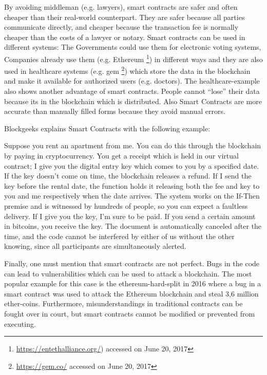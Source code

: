 By avoiding middleman (e.g. lawyers), smart contracts are safer and often cheaper than their real-world counterpart.
They are safer because all parties communicate directly, and cheaper because the transaction fee is normally cheaper than the costs of a lawyer or notary.
Smart contracts can be used in different systems:
The Governments could use them for electronic voting systems, Companies already use them (e.g. Ethereum \footnote{\url{https://entethalliance.org/}) accessed on June 20, 2017}) in different ways and they are also used in healthcare systems (e.g. gem \footnote{\url{https://gem.co/} accessed on June 20, 2017}) which store the data in the blockchain and make it available for authorized users (e.g. doctors).
The healthcare-example also shows another advantage of smart contracts.
People cannot ``lose'' their data because its in the blockchain which is distributed.
Also Smart Contracts are more accurate than manually filled forms because they avoid manual errors.

Blockgeeks explains Smart Contracts with the following example:

\begin{displayquote}
	Suppose you rent an apartment from me. You can do this through the blockchain by paying in cryptocurrency. You get a receipt which is held in our virtual contract; I give you the digital entry key which comes to you by a specified date. If the key doesn’t come on time, the blockchain releases a refund. If I send the key before the rental date, the function holds it releasing both the fee and key to you and me respectively when the date arrives. The system works on the If-Then premise and is witnessed by hundreds of people, so you can expect a faultless delivery. If I give you the key, I’m sure to be paid. If you send a certain amount in bitcoins, you receive the key. The document is automatically canceled after the time, and the code cannot be interfered by either of us without the other knowing, since all participants are simultaneously alerted.~\cite{blockgeeks}
\end{displayquote}

Finally, one must mention that smart contracts are not perfect. Bugs in the code can lead to vulnerabilities which can be used to attack a blockchain.
The most popular example for this case is the ethereum-hard-split in 2016 \cite{heise-dao} where a bug in a smart contract was used to attack the Ethereum blockchain and steal 3,6 million ether-coins.
Furthermore, misunderstandings in traditional contracts can be fought over in court, but smart contracts cannot be modified or prevented from executing.
\cite{blockgeeks}



